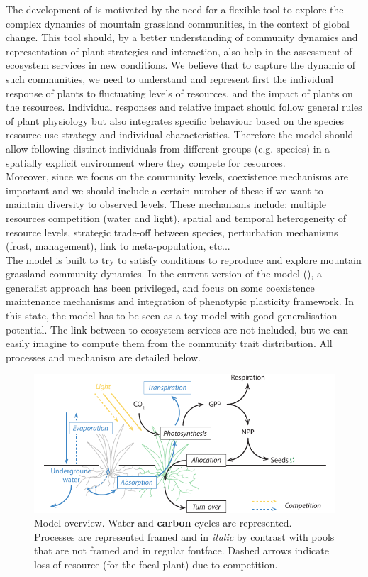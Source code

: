 The development of \model is motivated by the need for a flexible tool to explore the complex dynamics of mountain grassland communities, in the context of global change. This tool should, by a better understanding of community dynamics and representation of plant strategies and interaction, also help in the assessment of ecosystem services in new conditions. We believe that to capture the dynamic of such communities, we need to understand and represent first the individual response of plants to fluctuating levels of resources, and the impact of plants on the resources. Individual responses and relative impact should follow general rules of plant physiology but also integrates specific behaviour based on the species resource use strategy and individual characteristics. Therefore the model should allow following distinct individuals from different groups (e.g. species) in a spatially explicit environment where they compete for resources.\\
\indent Moreover, since we focus on the community levels, coexistence mechanisms are important and we should include a certain number of these if we want to maintain diversity to observed levels. These mechanisms include: multiple resources competition (water and light), spatial and temporal heterogeneity of resource levels, strategic trade-off between species, perturbation mechanisms (frost, management), link  to meta-population, etc...\\
\indent The model is built to try to satisfy conditions to reproduce and explore mountain grassland community dynamics. In the current version of the model (\version), a generalist approach has been privileged, and focus on some coexistence maintenance mechanisms and integration of phenotypic plasticity framework. In this state, the model has to be seen as a toy model with good generalisation potential. The link between to ecosystem services are not included, but we can easily imagine to compute them from the community trait distribution. All processes and mechanism are detailed below.

\begin{figure}
\includegraphics[width = 1\linewidth]{./1_Introduction/graphics/model_cycles.pdf}
\caption{Model overview. \textcolor{myBlue}{Water} and \textbf{carbon} cycles are represented. Processes are represented framed and in \textit{italic} by contrast with pools that are not framed and in regular fontface. Dashed arrows indicate loss of resource (for the \textcolor{myGreen}{focal plant}) due to competition.}\label{fig:overview}
\end{figure}


